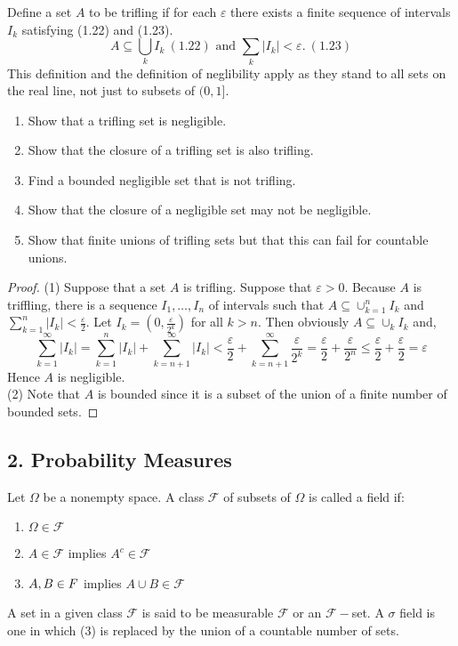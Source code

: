 \documentclass[11pt]{article}
\newcommand{\F}{\mathcal{F}}
\newcommand{\seq}{\subseteq}
\newcommand{\e}{\varepsilon}
\newcommand{\mc}{\mathcal}
\newcommand{\un}{\cup}
\newenvironment{definition}[2][Definition]{\begin{trivlist}
\item[\hskip \labelsep {\bfseries #1}\hskip \labelsep {\bfseries #2.}]}{\end{trivlist}}
\newenvironment{exercise}[2][Exercise]{\begin{trivlist}
\item[\hskip \labelsep {\bfseries #1}\hskip \labelsep {\bfseries #2.}]}{\end{trivlist}}
\begin{document}
\begin{exercise}{1.3}
    Define a set $A$ to be trifling if for each $\e$ there exists a finite sequence of intervals $I_k$ satisfying (1.22) and (1.23).
    \[ A \seq \bigcup_{k} I_k \ (1.22) \text { and } \sum_{k} |I_k| < \e. \ (1.23) \]
    This definition and the definition of neglibility apply as they stand to all sets on the real line, not just to subsets of $(0, 1]$.
    \begin{enumerate}
        \item Show that a trifling set is negligible.
        \item Show that the closure of a trifling set is also trifling.
        \item Find a bounded negligible set that is not trifling.
        \item Show that the closure of a negligible set may not be negligible.
        \item Show that finite unions of trifling sets but that this can fail for countable unions.
    \end{enumerate}
\end{exercise}
\begin{proof}
    (1) Suppose that a set $A$ is trifling. Suppose that $\e > 0$. Because $A$ is triffling, there is a sequence $I_1, \ldots, I_n$ of intervals such that $A \seq \un_{k=1}^{n} I_k$ and $\sum_{k=1}^{n} |I_k| < \frac{\e}{2}$. Let $I_{k} = (0, \frac{\e}{2^{k}})$ for all $k > n$. Then obviously $A \seq \un_{k} I_k$ and,
    \[ \sum_{k=1}^{\infty} |I_k| = \sum_{k=1}^{n} |I_k| + \sum_{k=n+1}^{\infty} |I_k| < \frac{\e}{2}  + \sum_{k=n+1}^{\infty} \frac{\e}{2^{k}} = \frac{\e}{2} + \frac{\e}{2^{n}}  \leq \frac{\e}{2} + \frac{\e}{2} = \e    \]
    Hence $A$ is negligible. \\
    (2) Note that $A$ is bounded since it is a subset of the union of a finite number of bounded sets. 
\end{proof}

\pagebreak
\subsection*{2. Probability Measures}
\begin{definition}{1}
    Let $\Omega$ be a nonempty space. A class $\mc F$ of subsets of $\Omega$ is called a field if:
    \begin{enumerate}
        \item $\Omega \in \F$
        \item $A \in \F$ implies $A^c \in \F$
        \item $A, B \in \mc \F$ implies $A \un B \in \F$
    \end{enumerate}
    A set in a given class $\F$ is said to be measurable $\F$ or an $\F-$set. A $\sigma$ field is one in which (3) is replaced by the union of a countable number of sets.
\end{definition}
\end{document}
